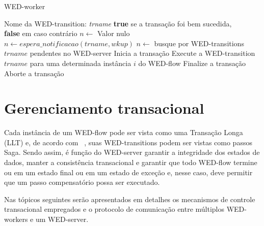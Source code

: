 \documentclass[conference]{IEEEtran}
\begin{document}
\begin{algorithm}
\caption{WED-worker}
\label{alg1}
\begin{algorithmic}[1]
\REQUIRE Nome da WED-transition: \emph{trname}
\ENSURE \textbf{true} se a transação foi bem sucedida,\\
         \hspace{23pt}\textbf{false} em caso contrário
\LOOP
\STATE $n \leftarrow$ Valor nulo
\STATE $n \leftarrow espera\_notificacao(trname,wkup)$
\STATE $n \leftarrow $ busque por WED-transitions $trname$ pendentes no WED-server
\ENDIF
\ENDWHILE
\STATE Inicia a transação 
\STATE Execute a WED-transition $trname$ para uma determinada instância $i$ do WED-flow
\STATE Finalize a transação
\RETURN \TRUE
\ELSE
\STATE Aborte a transação
\RETURN \FALSE
\ENDIF  
\ENDLOOP

\end{algorithmic}
\end{algorithm}

\section{Gerenciamento transacional}
Cada instância de um WED-flow pode ser vista como uma Transação Longa (LLT) e, de acordo com ~\cite{SGD87},
suas WED-transitions podem ser vistas como passos Saga. Sendo assim, é função do WED-server garantir a integridade dos estados
de dados, manter a consistência transacional e garantir que todo WED-flow termine ou em um estado final ou em um estado
de exceção e, nesse caso, deve permitir que um passo compensatório possa ser executado. 
\par
Nas tópicos seguintes serão apresentados em detalhes os mecanismos de controle transacional empregados e o protocolo de
comunicação entre múltiplos WED-workers e um WED-server.

\end{document}
